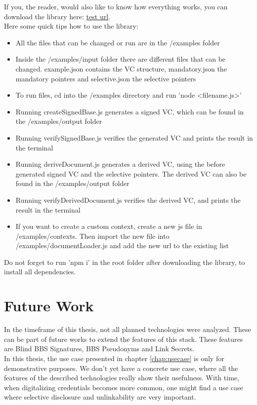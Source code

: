 \documentclass[
	a4paper               %
	,BCOR=0mm            %
	,bibliography=totoc   %
	,listof=totoc         %
	,monolingual
	,twoside=false
]{bfhthesis}              %
\begin{document}
If you, the reader, would also like to know how everything works, you can download the library here: \url{test url}.\\

Here some quick tips how to use the library:
\begin{itemize}
	\item All the files that can be changed or run are in the /examples folder
	\item Inside the /examples/input folder there are different files that can be changed. example.json contains the VC structure, mandatory.json the mandatory pointers and selective.json the selective pointers
	\item To run files, cd into the /examples directory and run 'node <filename.js>'
	\item Running createSignedBase.js generates a signed VC, which can be found in the /examples/output folder
	\item Running verifySignedBase.js verifies the generated VC and prints the result in the terminal
	\item Running deriveDocument.js generates a derived VC, using the before generated signed VC and the selective pointers. The derived VC can also be found in the /examples/output folder
	\item Running verifyDerivedDocument.js verifies the derived VC, and prints the result in the terminal
	\item If you want to create a custom context, create a new js file in /examples/contexts. Then import the new file into /examples/documentLoader.js and add the new url to the existing list
\end{itemize}

Do not forget to run 'npm i' in the root folder after downloading the library, to install all dependencies.


\chapter{Future Work}
In the timeframe of this thesis, not all planned technologies were analyzed. These can be part of future works to extend the features of this stack. These features are Blind BBS Signatures, BBS Pseudonyms and Link Secrets. \\

In this thesis, the use case presented in chapter \ref{chap:usecase} is only for demonstrative purposes. We don't yet have a concrete use case, where all the features of the described technologies really show their usefulness. With time, when digitalizing credentials becomes more common, one might find a use case where selective disclosure and unlinkability are very important. \\
\end{document}
